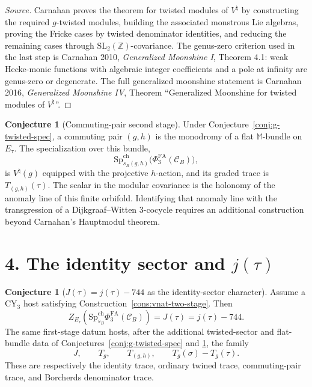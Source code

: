 \documentclass[11pt]{article}
\providecommand{\Z}{\mathbb{Z}}
\providecommand{\Vnat}{V^{\natural}}
\providecommand{\Mon}{\mathbb{M}}
\providecommand{\SpCh}{\mathrm{Sp}^{\mathrm{ch}}}
\providecommand{\PhiFA}{\Phi^{\mathrm{FA}}}
\providecommand{\Tg}{T_g}
\providecommand{\Tgh}{T_{(g,h)}}
\theoremstyle{plain}
\theoremstyle{definition}
\newtheorem{conjecture}[theorem]{Conjecture}
\begin{document}
\begin{proof}[Source]
Carnahan proves the theorem for twisted modules of \(\Vnat\) by
constructing the required \(g\)-twisted modules, building the associated
monstrous Lie algebras, proving the Fricke cases by twisted denominator
identities, and reducing the remaining cases through
\(\mathrm{SL}_2(\Z)\)-covariance. The genus-zero criterion used in the
last step is Carnahan 2010, \emph{Generalized Moonshine I}, Theorem 4.1:
weak Hecke-monic functions with algebraic integer coefficients and a
pole at infinity are genus-zero or degenerate. The full generalized
moonshine statement is Carnahan 2016, \emph{Generalized Moonshine IV},
Theorem ``Generalized Moonshine for twisted modules of \(V^\natural\)''.
\end{proof}

\begin{conjecture}[Commuting-pair second stage]
\label{conj:two-stage-hosting-generalized}
Under Conjecture~\ref{conj:g-twisted-spec}, a commuting pair
\((g,h)\) is the monodromy of a flat \(\Mon\)-bundle on \(E_\tau\).
The specialization over this bundle,
\[
  \SpCh_{s_B(g,h)}\bigl(\PhiFA_3(\mathcal C_B)\bigr),
\]
is \(V^\natural(g)\) equipped with the projective \(h\)-action, and its
graded trace is \(\Tgh(\tau)\). The scalar in the modular covariance is
the holonomy of the anomaly line of this finite orbifold. Identifying
that anomaly line with the transgression of a Dijkgraaf--Witten
\(3\)-cocycle requires an additional construction beyond Carnahan's
Hauptmodul theorem.
\end{conjecture}

\section*{4. The identity sector and \(j(\tau)\)}

\begin{conjecture}[\(J(\tau)=j(\tau)-744\) as the identity-sector character]
\label{conj:j-universal-witness}
Assume a CY\(_3\) host satisfying
Construction~\ref{cons:vnat-two-stage}. Then
\[
  Z_{E_\tau}\!\left(
  \SpCh_{s_B}\PhiFA_3(\mathcal C_B)
  \right)
  =
  J(\tau)
  =
  j(\tau)-744.
\]
The same first-stage datum hosts, after the additional twisted-sector
and flat-bundle data of Conjectures~\ref{conj:g-twisted-spec} and
\ref{conj:two-stage-hosting-generalized}, the family
\[
  J,\qquad \Tg,\qquad \Tgh,\qquad
  \Tg(\sigma)-\Tg(\tau).
\]
These are respectively the identity trace, ordinary twined trace,
commuting-pair trace, and Borcherds denominator trace.
\end{conjecture}
\end{document}
